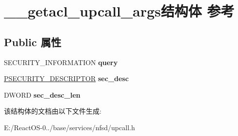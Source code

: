 \hypertarget{struct____getacl__upcall__args}{}\section{\+\_\+\+\_\+getacl\+\_\+upcall\+\_\+args结构体 参考}
\label{struct____getacl__upcall__args}
\subsection*{Public 属性}
\begin{DoxyCompactItemize}
\item 
\mbox{\label{struct____getacl__upcall__args_a2cf74a8cca6030cd8977cd9a78cc6d4c}} 
S\+E\+C\+U\+R\+I\+T\+Y\+\_\+\+I\+N\+F\+O\+R\+M\+A\+T\+I\+ON {\bfseries query}
\item 
\mbox{\label{struct____getacl__upcall__args_a1026a1519ec7025eef11a9618729aafb}} 
\hyperlink{struct___s_e_c_u_r_i_t_y___d_e_s_c_r_i_p_t_o_r}{P\+S\+E\+C\+U\+R\+I\+T\+Y\+\_\+\+D\+E\+S\+C\+R\+I\+P\+T\+OR} {\bfseries sec\+\_\+desc}
\item 
\mbox{\label{struct____getacl__upcall__args_a7e6988b66b8c4d22c9b41c35584c2c2b}} 
D\+W\+O\+RD {\bfseries sec\+\_\+desc\+\_\+len}
\end{DoxyCompactItemize}


该结构体的文档由以下文件生成\+:\begin{DoxyCompactItemize}
\item 
E\+:/\+React\+O\+S-\/0../base/services/nfsd/upcall.\+h\end{DoxyCompactItemize}
